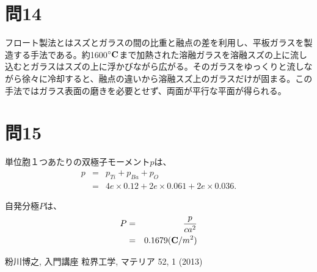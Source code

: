 \documentclass[11pt,a4paper]{jsarticle}
\begin{document}
\section*{問14}
フロート製法とはスズとガラスの間の比重と融点の差を利用し、平板ガラスを製造する手法である。約1600$\bf ^\circ C$まで加熱された溶融ガラスを溶融スズの上に流し込むとガラスはスズの上に浮かびながら広がる。そのガラスをゆっくりと流しながら徐々に冷却すると、融点の違いから溶融スズ上のガラスだけが固まる。この手法ではガラス表面の磨きを必要とせず、両面が平行な平面が得られる。

\section*{問15}
単位胞１つあたりの双極子モーメント$p$は、
\begin{eqnarray}
p &=& p_{Ti} + p_{Ba} + p_{O}\\
 &=& 4e \times 0.12 + 2e \times 0.061 + 2e \times 0.036.
\end{eqnarray}

自発分極$P$は、
\begin{eqnarray}
P &=& \frac{p}{ca^2}\\
 &=& 0.1679 ({\bf C}/m^2)
\end{eqnarray}


\begin{thebibliography}{9}
 粉川博之, 入門講座 粒界工学, マテリア 52, 1 (2013)
\end{thebibliography}
\end{document}
